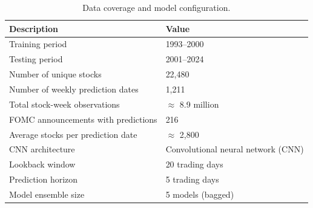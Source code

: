 \begin{table}[ht]
\centering
\caption{Data coverage and model configuration.}
\label{tab:sample_stats}
\begin{tabular}{ll}
\toprule
Description & Value \\
\midrule
Training period & 1993–2000 \\
Testing period & 2001–2024 \\
Number of unique stocks & 22,480 \\
Number of weekly prediction dates & 1,211 \\
Total stock-week observations & $\approx$ 8.9 million \\
FOMC announcements with predictions & 216 \\
Average stocks per prediction date & $\approx$ 2,800 \\
CNN architecture & Convolutional neural network (CNN) \\
Lookback window & 20 trading days \\
Prediction horizon & 5 trading days \\
Model ensemble size & 5 models (bagged) \\
\bottomrule
\end{tabular}
\end{table}
